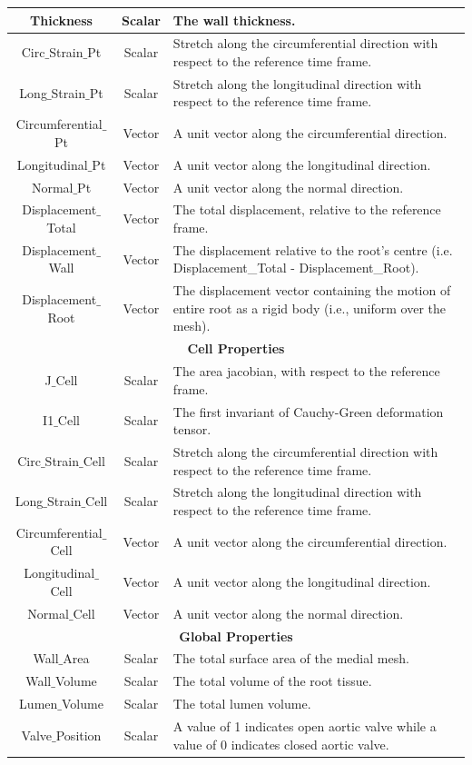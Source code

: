 \documentclass{article}
\begin{document}
\begin{tabular}{|c|c|p{9.4cm}|}
\hline
Thickness	&Scalar & The wall thickness.\\
	\hline
Circ$\_$Strain$\_$Pt	& Scalar & Stretch along the circumferential direction with respect to the reference time frame.\\
\hline
Long$\_$Strain$\_$Pt	& Scalar & Stretch along the longitudinal direction with respect to the reference time frame.\\
	\hline
Circumferential$\_$Pt	& Vector & A unit vector along the circumferential direction. \\
	\hline
Longitudinal$\_$Pt	&Vector & A unit vector along the longitudinal direction.\\
	\hline
Normal$\_$Pt	&Vector & A unit vector along the normal direction.\\
\hline
Displacement$\_$Total & Vector & The total displacement, relative to the reference frame. \\
	\hline
Displacement$\_$Wall & Vector & The displacement relative to the root's centre \newline (i.e. Displacement\_Total - Displacement\_Root). \\
	\hline
Displacement$\_$Root  &  Vector& The displacement vector containing the motion of entire root as a rigid body (i.e., uniform over the mesh).\\
\hline
\hline
\multicolumn{3}{|c|}{\textbf{Cell Properties}} \\
\hline
J$\_$Cell	& Scalar& The area jacobian, with respect to the reference frame.\\
\hline
I1$\_$Cell& Scalar & The first invariant of Cauchy-Green deformation tensor. \\
\hline
Circ$\_$Strain$\_$Cell & Scalar & Stretch along the circumferential direction with respect to the reference time frame.\\
\hline
Long$\_$Strain$\_$Cell & Scalar & Stretch along the longitudinal direction with respect to the reference time frame. \\
	\hline
Circumferential$\_$Cell	&  Vector  & A unit vector along the circumferential direction.\\
	\hline
Longitudinal$\_$Cell 	&  Vector & A unit vector along the longitudinal direction.\\
	\hline
Normal$\_$Cell 	&  Vector & A unit vector along the normal direction.\\
\hline
\hline
\multicolumn{3}{|c|}{\textbf{Global  Properties}} \\
\hline
Wall$\_$Area	&Scalar &The total surface area of the medial mesh. \\
	\hline
	Wall$\_$Volume	&Scalar &The total volume of the root tissue. \\
	\hline
	Lumen$\_$Volume	&Scalar &The total lumen volume. \\	
	\hline
Valve$\_$Position	&Scalar & A value of 1 indicates open aortic valve while a value of 0 indicates closed aortic valve.\\
	\hline
\end{tabular}
\end{document}
